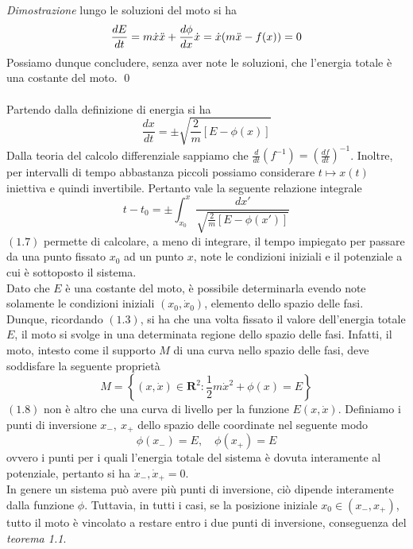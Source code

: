 \documentclass{article}
\begin{document}
\textit{Dimostrazione} lungo le soluzioni del moto si ha
\begin{equation}
    \frac{d E}{d t} = m\dot{x}\ddot{x} + \frac{d\phi}{dx}\dot{x} = \dot{x}(m\ddot{x} - f(x)) = 0 \notag
\end{equation}
Possiamo dunque concludere, senza aver note le soluzioni, che l'energia totale è una costante del moto. \qed \\ \\
Partendo dalla definizione di energia si ha
\begin{equation}
    \frac{dx}{dt} = \pm \sqrt{\frac{2}{m}[E - \phi(x)]} \tag{1.6}
\end{equation}
Dalla teoria del calcolo differenziale sappiamo che $\frac{d}{dt}(f^{-1}) = \left( \frac{df}{dt} \right)^{-1}$. Inoltre, per intervalli di tempo abbastanza piccoli possiamo considerare $t \mapsto x(t)$ iniettiva e quindi invertibile. Pertanto vale la seguente relazione integrale
\begin{equation}
    t - t_0 = \pm \int_{x_0}^{x} \frac{dx'}{\sqrt{\frac{2}{m}[E - \phi(x')]}} \tag{1.7}
\end{equation}
$(1.7)$ permette di calcolare, a meno di integrare, il tempo impiegato per passare da una punto fissato $x_0$ ad un punto $x$, note le condizioni iniziali e il potenziale a cui è sottoposto il sistema. \\
Dato che $E$ è una costante del moto, è possibile determinarla evendo note solamente le condizioni iniziali $(x_0, \dot{x}_0)$, elemento dello spazio delle fasi. Dunque, ricordando $(1.3)$, si ha che una volta fissato il valore dell'energia totale $E$, il moto si svolge in una determinata regione dello spazio delle fasi. Infatti, il moto, intesto come il supporto $M$ di una curva nello spazio delle fasi, deve soddisfare la seguente proprietà
\begin{equation}
    M = \left\{ (x, \dot{x}) \in \mathbf{R}^2 : \frac{1}{2}m\dot{x}^2 + \phi(x) = E \right\} \tag{1.8}
\end{equation}
$(1.8)$ non è altro che una curva di livello per la funzione $E(x, \dot{x})$. Definiamo i punti di inversione $x_-, \ x_+$ dello spazio delle coordinate nel seguente modo
\begin{equation}
    \phi(x_-) = E, \quad \phi(x_+) = E \tag{1.9}
\end{equation}
ovvero i punti per i quali l'energia totale del sistema è dovuta interamente al potenziale, pertanto si ha $\dot{x}_-, \dot{x}_+ = 0$. \\
In genere un sistema può avere più punti di inversione, ciò dipende interamente dalla funzione $\phi$. Tuttavia, in tutti i casi, se la posizione iniziale $x_0 \in (x_-, x_+)$, tutto il moto è vincolato a restare entro i due punti di inversione, conseguenza del \textit{teorema 1.1}. \\ \\
\end{document}
